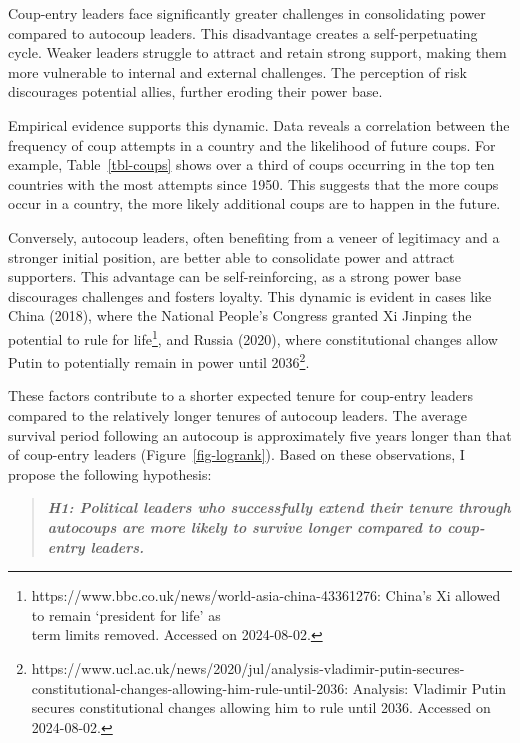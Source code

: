 \documentclass[
  12pt,
]{report}
\begin{document}
\endgroup

Coup-entry leaders face significantly greater challenges in
consolidating power compared to autocoup leaders. This disadvantage
creates a self-perpetuating cycle. Weaker leaders struggle to attract
and retain strong support, making them more vulnerable to internal and
external challenges. The perception of risk discourages potential
allies, further eroding their power base.

Empirical evidence supports this dynamic. Data reveals a correlation
between the frequency of coup attempts in a country and the likelihood
of future coups. For example, Table~\ref{tbl-coups} shows over a third
of coups occurring in the top ten countries with the most attempts since
1950. This suggests that the more coups occur in a country, the more
likely additional coups are to happen in the future.

Conversely, autocoup leaders, often benefiting from a veneer of
legitimacy and a stronger initial position, are better able to
consolidate power and attract supporters. This advantage can be
self-reinforcing, as a strong power base discourages challenges and
fosters loyalty. This dynamic is evident in cases like China (2018),
where the National People's Congress granted Xi Jinping the potential to
rule for life\footnote{https://www.bbc.co.uk/news/world-asia-china-43361276:
  China's Xi allowed to remain `president for life' as\\
  term limits removed. Accessed on 2024-08-02.}, and Russia (2020),
where constitutional changes allow Putin to potentially remain in power
until 2036\footnote{https://www.ucl.ac.uk/news/2020/jul/analysis-vladimir-putin-secures-constitutional-changes-allowing-him-rule-until-2036:
  Analysis: Vladimir Putin secures constitutional changes allowing him
  to rule until 2036. Accessed on 2024-08-02.}.

These factors contribute to a shorter expected tenure for coup-entry
leaders compared to the relatively longer tenures of autocoup leaders.
The average survival period following an autocoup is approximately five
years longer than that of coup-entry leaders (Figure~\ref{fig-logrank}).
Based on these observations, I propose the following hypothesis:

\begin{quote}
\textbf{\emph{H1: Political leaders who successfully extend their tenure
through autocoups are more likely to survive longer compared to
coup-entry leaders.}}
\end{quote}
\end{document}
